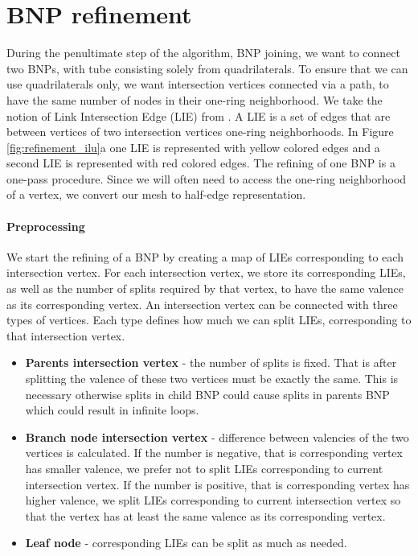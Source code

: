 \section{BNP refinement}\label{sec:bnp_sub}
During the penultimate step of the algorithm, BNP joining, we want to connect two BNPs, with tube consisting solely from quadrilaterals. To ensure that we can use quadrilaterals only, we want intersection vertices connected via a path, to have the same number of nodes in their one-ring neighborhood. We take the notion of Link Intersection Edge (LIE) from \cite{sqm}. A LIE is a set of edges that are between vertices of two intersection vertices one-ring neighborhoods. In Figure \ref{fig:refinement_ilu}a one LIE is represented with yellow colored edges and a second LIE is represented with red colored edges. The refining of one BNP is a one-pass procedure. Since we will often need to access the one-ring neighborhood of a vertex, we convert our mesh to half-edge representation.

\paragraph{Preprocessing}
We start the refining of a BNP by creating a map of LIEs corresponding to each intersection vertex. For each intersection vertex, we store its corresponding LIEs, as well as the number of splits required by that vertex, to have the same valence as its corresponding vertex. An intersection vertex can be connected with three types of vertices. Each type defines how much we can split LIEs, corresponding to that intersection vertex.
\begin{itemize}
	\itemsep-0.25em 
	\item \textbf{Parents intersection vertex} - the number of splits is fixed. That is after splitting the valence of these two vertices must be exactly the same. This is necessary otherwise splits in child BNP could cause splits in parents BNP which could result in infinite loops.
	\item \textbf{Branch node intersection vertex} - difference between valencies of the two vertices is calculated. If the number is negative, that is corresponding vertex has smaller valence, we prefer not to split LIEs corresponding to current intersection vertex. If the number is positive, that is corresponding vertex has higher valence, we split LIEs corresponding to current intersection vertex so that the vertex has at least the same valence as its corresponding vertex.
	\item \textbf{Leaf node} - corresponding LIEs can be split as much as needed.
\end{itemize}


